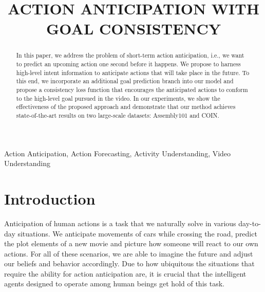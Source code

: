 \documentclass{article}
\title{ACTION ANTICIPATION WITH GOAL CONSISTENCY}
\begin{document}
\maketitle
\begin{abstract}
In this paper, we address the problem of short-term action anticipation, i.e., we want to predict an upcoming action one second before it happens. We propose to harness high-level intent information to anticipate actions that will take place in the future. To this end, we incorporate an additional goal prediction branch into our model and propose a consistency loss function that encourages the anticipated actions to conform to the high-level goal pursued in the video. In our experiments, we show the effectiveness of the proposed approach and demonstrate that our method achieves state-of-the-art results on two large-scale datasets: Assembly101 and COIN. 
\end{abstract}
\begin{keywords}
Action Anticipation, Action Forecasting, Activity Understanding, Video Understanding
\end{keywords}
\vspace{-0.1cm}
\section{Introduction}
\label{sec:intro}
Anticipation of human actions is a task that we naturally solve in various day-to-day situations. We anticipate movements of cars while crossing the road, predict the plot elements of a new movie and picture how someone will react to our own actions. For all of these scenarios, we are able to imagine the future and adjust our beliefs and behavior accordingly. Due to how ubiquitous the situations that require the ability for action anticipation are, it is crucial that the intelligent agents designed to operate among human beings get hold of this task. 
\end{document}
